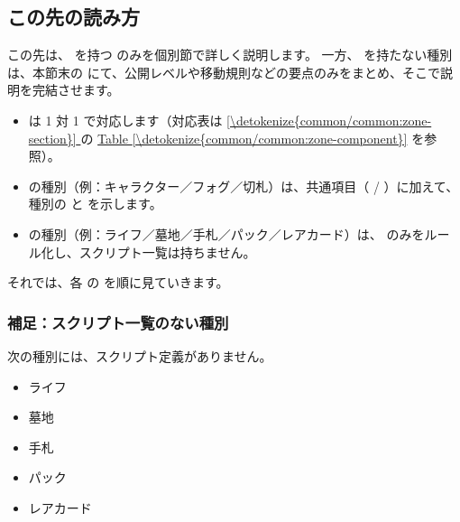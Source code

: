 \documentclass[letterpaper,10pt,dvipdfmx]{sphinxmanual}
\begin{document}
\subsection{この先の読み方}
\label{\detokenize{common/common-component:id7}}
\sphinxAtStartPar
この先は、  を持つ  のみを個別節で詳しく説明します。
一方、  を持たない種別は、本節末の  にて、公開レベルや移動規則などの要点のみをまとめ、そこで説明を完結させます。
\begin{itemize}
\item {} 
\sphinxAtStartPar
{} は 1 対 1 で対応します（対応表は \hyperref[\detokenize{common/common:zone-section}]{\ref{\detokenize{common/common:zone-section}} } の \hyperref[\detokenize{common/common:zone-component}]{Table \ref{\detokenize{common/common:zone-component}}} を参照）。

\item {} 
\sphinxAtStartPar
{} の種別（例：キャラクター／フォグ／切札）は、共通項目（  /  ）に加えて、種別の  と  を示します。

\item {} 
\sphinxAtStartPar
{} の種別（例：ライフ／墓地／手札／パック／レアカード）は、  のみをルール化し、スクリプト一覧は持ちません。

\end{itemize}

\sphinxAtStartPar
それでは、各  の  を順に見ていきます。


\subsubsection{補足：スクリプト一覧のない種別}
\label{\detokenize{common/common-component:components-no-script-note}}\label{\detokenize{common/common-component:id8}}
\sphinxAtStartPar
次の種別には、スクリプト定義がありません。
\begin{itemize}
\item {} 
\sphinxAtStartPar
ライフ

\item {} 
\sphinxAtStartPar
墓地

\item {} 
\sphinxAtStartPar
手札

\item {} 
\sphinxAtStartPar
パック

\item {} 
\sphinxAtStartPar
レアカード

\end{itemize}
\end{document}
